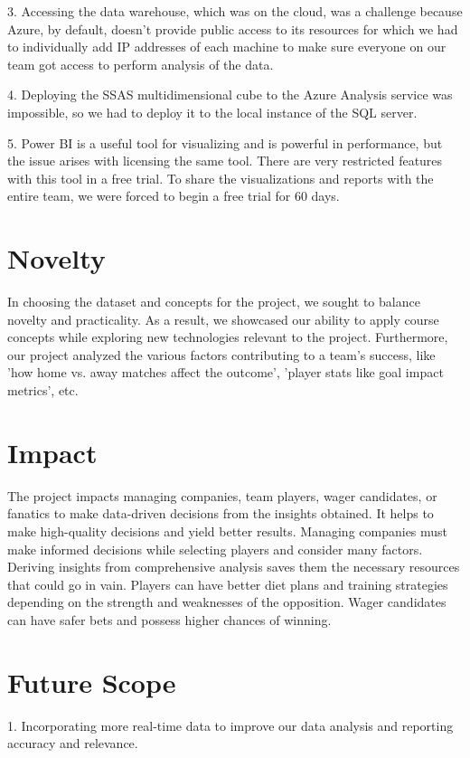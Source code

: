 \documentclass[lettersize]{IEEEtran}
\begin{document}
3. Accessing the data warehouse, which was on the cloud, was a challenge because Azure, by default, doesn’t provide public access to its resources for which we had to individually add IP addresses of each machine to make sure everyone on our team got access to perform analysis of the data.

4. Deploying the SSAS multidimensional cube to the Azure Analysis service was impossible, so we had to deploy it to the local instance of the SQL server.

5. Power BI is a useful tool for visualizing and is powerful in performance, but the issue arises with licensing the same tool. There are very restricted features with this tool in a free trial. To share the visualizations and reports with the entire team, we were forced to begin a free trial for 60 days. 

\section{\textbf{Novelty}}
\vspace{-0.2\baselineskip}
In choosing the dataset and concepts for the project, we sought to balance novelty and practicality. As a result, we showcased our ability to apply course concepts while exploring new technologies relevant to the project. Furthermore, our project analyzed the various factors contributing to a team's success, like 'how home vs. away matches affect the outcome', 'player stats like goal impact metrics', etc.

\section{\textbf{Impact}}
\vspace{-0.3\baselineskip}
The project impacts managing companies, team players, wager candidates, or fanatics to make data-driven decisions from the insights obtained. It helps to make high-quality decisions and yield better results. Managing companies must make informed decisions while selecting players and consider many factors. Deriving insights from comprehensive analysis saves them the necessary resources that could go in vain. Players can have better diet plans and training strategies depending on the strength and weaknesses of the opposition. Wager candidates can have safer bets and possess higher chances of winning.

\section{\textbf{Future Scope}}
1. Incorporating more real-time data to improve our data analysis and reporting accuracy and relevance.
\end{document}

